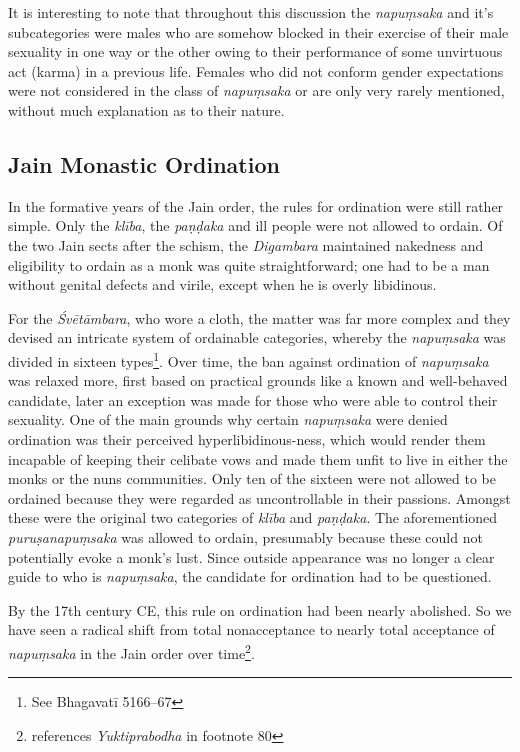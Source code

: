 It is interesting to note that throughout this discussion the {\em napuṃsaka} and it's subcategories were males who are somehow blocked in their exercise of their male sexuality in one way or the other owing to their performance of some unvirtuous act (karma) in a previous life. Females who did not conform gender expectations were not considered in the class of {\em napuṃsaka} or are only very rarely mentioned, without much explanation as to their nature. 

\subsection{Jain Monastic Ordination}
In the formative years of the Jain order, the rules for ordination were still rather simple. Only the {\em klība}, the {\em paṇḍaka} and ill people were not allowed to ordain. Of the two Jain sects after the schism, the {\em Digambara} maintained nakedness and eligibility to ordain as a monk was quite straightforward; one had to be a man without genital defects and virile, except when he is overly libidinous. 

For the {\em Śvētāmbara}, who wore a cloth, the matter was far more complex and they devised an intricate system of ordainable categories, whereby the {\em napuṃsaka} was divided in sixteen types\footnote{See Bhagavatī 5166–67}. Over time, the ban against ordination of {\em napuṃsaka} was relaxed more, first based on practical grounds like a known and well-behaved candidate, later an exception was made for those who were able to control their sexuality. One of the main grounds why certain {\em napuṃsaka} were denied ordination was their perceived hyperlibidinous-ness, which would render them incapable of keeping their celibate vows and made them unfit to live in either the monks or the nuns communities. Only ten of the sixteen were not allowed to be ordained because they were regarded as uncontrollable in their passions. Amongst these were the original two categories of {\em klība} and {\em paṇḍaka}. The aforementioned {\em puruṣanapuṃsaka} was allowed to ordain, presumably because these could not potentially evoke a monk's lust. Since outside appearance was no longer a clear guide to who is {\em napuṃsaka}, the candidate for ordination had to be questioned. 

By the 17th century CE, this rule on ordination had been nearly abolished. So we have seen a radical shift from total nonacceptance to nearly total acceptance of {\em napuṃsaka} in the Jain order over time\footnote{\cite{zwilling} references {\em Yuktiprabodha} in footnote 80}.



